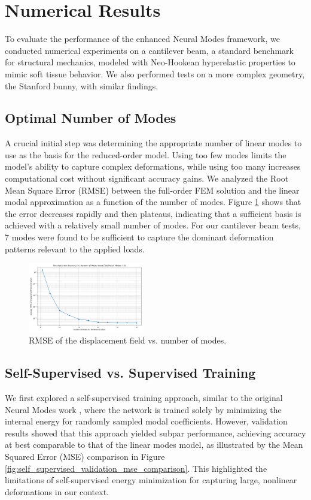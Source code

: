 \documentclass[11pt,a4paper,twocolumn]{article}
\begin{document}
\section{Numerical Results}
\label{sec:es:numerical_results}

To evaluate the performance of the enhanced Neural Modes framework, we conducted numerical experiments on a cantilever beam, a standard benchmark for structural mechanics, modeled with Neo-Hookean hyperelastic properties to mimic soft tissue behavior. We also performed tests on a more complex geometry, the Stanford bunny, with similar findings.

\subsection{Optimal Number of Modes}
A crucial initial step was determining the appropriate number of linear modes to use as the basis for the reduced-order model. Using too few modes limits the model's ability to capture complex deformations, while using too many increases computational cost without significant accuracy gains. We analyzed the Root Mean Square Error (RMSE) between the full-order FEM solution and the linear modal approximation as a function of the number of modes. Figure \ref{fig:optimal_number_modes} shows that the error decreases rapidly and then plateaus, indicating that a sufficient basis is achieved with a relatively small number of modes. For our cantilever beam tests, 7 modes were found to be sufficient to capture the dominant deformation patterns relevant to the applied loads.

\begin{figure}[H]
    \centering
    \includegraphics[width=0.45\textwidth]{Images/rmse_vs_modes.png}
    \caption{RMSE of the displacement field vs. number of modes.}
    \label{fig:optimal_number_modes}
\end{figure}

\subsection{Self-Supervised vs. Supervised Training}
We first explored a self-supervised training approach, similar to the original Neural Modes work \cite{Wang_Du_Coros_Thomaszewski_2024}, where the network is trained solely by minimizing the internal energy for randomly sampled modal coefficients. However, validation results showed that this approach yielded subpar performance, achieving accuracy at best comparable to that of the linear modes model, as illustrated by the Mean Squared Error (MSE) comparison in Figure \ref{fig:self_supervised_validation_mse_comparison}. This highlighted the limitations of self-supervised energy minimization for capturing large, nonlinear deformations in our context.
\end{document}
